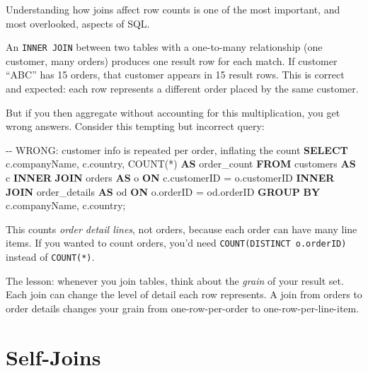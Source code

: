 \documentclass[
  letterpaper,
  DIV=11,
  numbers=noendperiod]{scrreprt}
\newenvironment{Shaded}{\begin{snugshade}}{\end{snugshade}}
\newcommand{\CommentTok}[1]{\textcolor[rgb]{0.37,0.37,0.37}{#1}}
\newcommand{\FunctionTok}[1]{\textcolor[rgb]{0.28,0.35,0.67}{#1}}
\newcommand{\KeywordTok}[1]{\textcolor[rgb]{0.00,0.23,0.31}{\textbf{#1}}}
\newcommand{\NormalTok}[1]{\textcolor[rgb]{0.00,0.23,0.31}{#1}}
\newcommand{\OperatorTok}[1]{\textcolor[rgb]{0.37,0.37,0.37}{#1}}
\begin{document}
Understanding how joins affect row counts is one of the most important,
and most overlooked, aspects of SQL.

An \texttt{INNER\ JOIN} between two tables with a one-to-many
relationship (one customer, many orders) produces one result row for
each match. If customer ``ABC'' has 15 orders, that customer appears in
15 result rows. This is correct and expected: each row represents a
different order placed by the same customer.

But if you then aggregate without accounting for this multiplication,
you get wrong answers. Consider this tempting but incorrect query:

\begin{codelisting}

\caption{\texttt{duckdb}}

\begin{Shaded}
\begin{Highlighting}[]
\CommentTok{{-}{-} WRONG: customer info is repeated per order, inflating the count}
\KeywordTok{SELECT}
\NormalTok{    c.companyName,}
\NormalTok{    c.country,}
    \FunctionTok{COUNT}\NormalTok{(}\OperatorTok{*}\NormalTok{) }\KeywordTok{AS}\NormalTok{ order\_count}
\KeywordTok{FROM}\NormalTok{ customers }\KeywordTok{AS}\NormalTok{ c}
\KeywordTok{INNER} \KeywordTok{JOIN}\NormalTok{ orders }\KeywordTok{AS}\NormalTok{ o}
    \KeywordTok{ON}\NormalTok{ c.customerID }\OperatorTok{=}\NormalTok{ o.customerID}
\KeywordTok{INNER} \KeywordTok{JOIN}\NormalTok{ order\_details }\KeywordTok{AS}\NormalTok{ od}
    \KeywordTok{ON}\NormalTok{ o.orderID }\OperatorTok{=}\NormalTok{ od.orderID}
\KeywordTok{GROUP} \KeywordTok{BY}\NormalTok{ c.companyName, c.country;}
\end{Highlighting}
\end{Shaded}

\end{codelisting}

This counts \emph{order detail lines}, not orders, because each order
can have many line items. If you wanted to count orders, you'd need
\texttt{COUNT(DISTINCT\ o.orderID)} instead of \texttt{COUNT(*)}.

The lesson: whenever you join tables, think about the \emph{grain} of
your result set. Each join can change the level of detail each row
represents. A join from orders to order details changes your grain from
one-row-per-order to one-row-per-line-item.

\section{Self-Joins}\label{self-joins}
\end{document}
